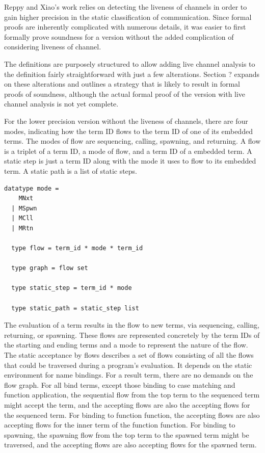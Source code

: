 \documentclass[10pt]{article}
\begin{document}
Reppy and Xiao's work relies on detecting the liveness of channels in order to gain higher
precision in the static classification of communication. Since formal proofs are inherently
complicated with numerous details, it was easier to first formally prove soundness for a
version without the added complication of considering liveness of channel.

The definitions are purposely structured to allow adding live channel analysis to the
definition fairly straightforward with just a few alterations.  Section ? expands on
these alterations and outlines a strategy that is likely to result in formal proofs of
soundness, although the actual formal proof of the version with live channel analysis is
not yet complete.  

For the lower precision version without the liveness of channels, there are four modes,
indicating how the term ID flows to the term ID of one of
its embedded terms.
The modes of flow are sequencing, calling, spawning, and returning. A flow is a
triplet of a term ID, a mode of flow, and a term ID of a
embedded term. A static step is just a term ID along with the mode it uses to
flow to its embedded term. A static path is a list of static steps.  

\begin{lstlisting}[language=logic, mathescape]
  datatype mode =
    MNxt
  | MSpwn
  | MCll
  | MRtn

  type flow = term_id * mode * term_id

  type graph = flow set

  type static_step = term_id * mode

  type static_path = static_step list
\end{lstlisting}

The evaluation of a term results in the flow to new terms,
via sequencing, calling, returning, or spawning.  These flows are represented concretely
by the term IDs of the starting and ending terms and a mode
to represent the nature of the flow.
The static acceptance by flows describes a set of flows consisting of all the flows
that could be traversed during a program's evaluation.
It depends on the static environment for name bindings.
For a result term, there are no demands on the flow graph.  For all bind terms, except those binding
to case matching and function application, the sequential flow from the top term to
the sequenced term might accept the term, and the accepting flows are also the
accepting flows for the sequenced term.  For binding to function function, the
accepting flows are also accepting flows for the inner term of the
function function.  For binding to spawning, the spawning flow from the top term
to the spawned term might be traversed, and the accepting flows are also
accepting flows for the spawned term.
\end{document}
